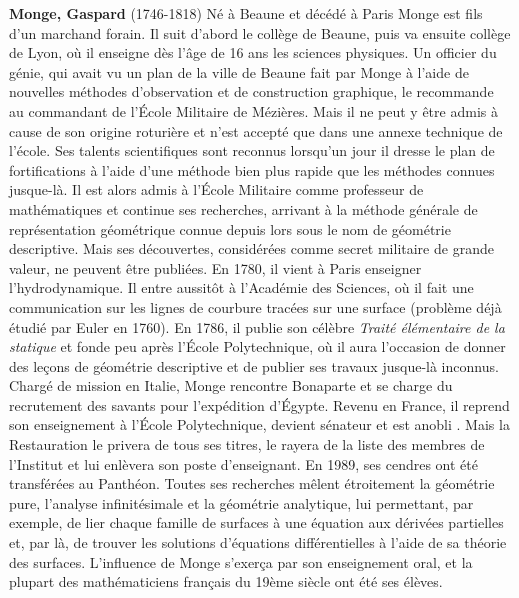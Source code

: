 \textbf{Monge, Gaspard} (1746-1818) Né à Beaune et décédé à Paris Monge est fils d'un marchand forain. Il suit d'abord le collège de Beaune, puis va ensuite collège de Lyon, où il enseigne dès l'âge de 16 ans les sciences physiques. Un officier du génie, qui avait vu un plan de la ville de Beaune fait par Monge à l'aide de nouvelles méthodes d'observation et de construction graphique, le recommande au commandant de l'École Militaire de Mézières. Mais il ne peut y être admis à cause de son origine roturière et n'est accepté que dans une annexe technique de l'école. Ses talents scientifiques sont reconnus lorsqu'un jour il dresse le plan de fortifications à l'aide d'une méthode bien plus rapide que les méthodes connues jusque-là. Il est alors admis à l'École Militaire comme professeur de mathématiques et continue ses recherches, arrivant à la méthode générale de représentation géométrique connue depuis lors sous le nom de géométrie descriptive. Mais ses découvertes, considérées comme secret militaire de grande valeur, ne peuvent être publiées. En 1780, il vient à Paris enseigner l'hydrodynamique. Il entre aussitôt à l'Académie des Sciences, où il fait une communication sur les lignes de courbure tracées sur une surface (problème déjà étudié par Euler en 1760). En 1786, il publie son célèbre \textit{Traité élémentaire de la statique} et fonde peu après l'École Polytechnique, où il aura l'occasion de donner des leçons de géométrie descriptive et de publier ses travaux jusque-là inconnus. Chargé de mission en Italie, Monge rencontre Bonaparte et se charge du recrutement des savants pour l'expédition d'Égypte. Revenu en France, il reprend son enseignement à l'École Polytechnique, devient sénateur et est anobli . Mais la Restauration le privera de tous ses titres, le rayera de la liste des membres de l'Institut et lui enlèvera son poste d'enseignant. En 1989, ses cendres ont été transférées au Panthéon. Toutes ses recherches mêlent étroitement la géométrie pure, l'analyse infinitésimale et la géométrie analytique, lui permettant, par exemple, de lier chaque famille de surfaces à une équation aux dérivées partielles et, par là, de trouver les solutions d'équations différentielles à l'aide de sa théorie des surfaces. L'influence de Monge s'exerça par son enseignement oral, et la plupart des mathématiciens français du 19ème siècle ont été ses élèves.

